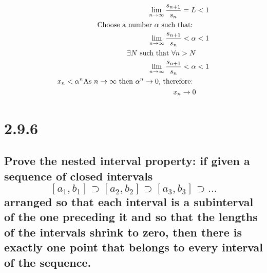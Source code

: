 \documentclass[11pt]{article}
\begin{document}
		\begin{align*}
			\lim_{n \to \infty}\frac{s_{n+1}}{s_n}{} = L &< 1 \\
			\text{Choose a number $\alpha$ such that: } \\
			\lim_{n \to \infty}\frac{s_{n+1}}{s_n}{} < \alpha &< 1 \\
			\exists N \text{ such that $\forall n > N$} \\
			\lim_{n \to \infty}\frac{s_{n+1}}{s_n}{} < \alpha &< 1 \\	
			x_n < \alpha^n 
			\text{As $n \rightarrow \infty$ then $\alpha^n \rightarrow 0$, therefore: } \\
			x_n \rightarrow 0 \\					
		\end{align*}
	
	\section*{2.9.6} 
	\subsection*{Prove the nested interval property: if given a sequence of closed intervals $$[a_1, b_1] \supset [a_2, b_2] \supset [a_3, b_3] \supset \dots $$ arranged so that each interval is a subinterval of the one preceding it and so that the lengths of the intervals shrink to zero, then there is exactly one point that belongs to every interval of the sequence. }
	
\end{document}
